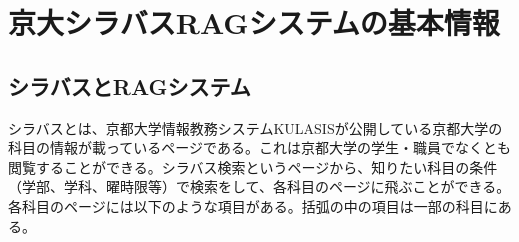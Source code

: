 





% 
\section{京大シラバスRAGシステムの基本情報}
\subsection{シラバスとRAGシステム}
シラバスとは、京都大学情報教務システムKULASISが公開している京都大学の科目の情報が載っているページである。これは京都大学の学生・職員でなくとも閲覧することができる。シラバス検索というページから、知りたい科目の条件（学部、学科、曜時限等）で検索をして、各科目のページに飛ぶことができる。各科目のページには以下のような項目がある。括弧の中の項目は一部の科目にある。\\


